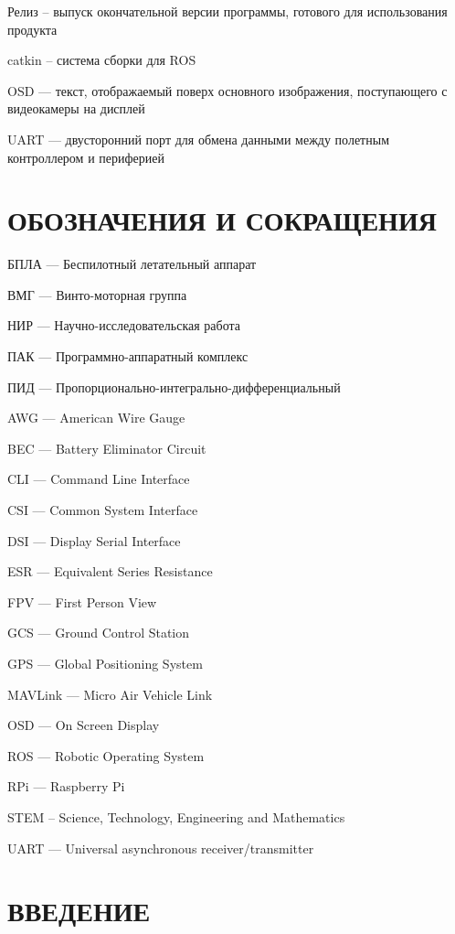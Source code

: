 \documentclass[a4paper,12pt]{article}
\begin{document}
Релиз -- выпуск окончательной версии программы, готового для использования продукта

catkin -- система сборки для ROS

OSD --- текст, отображаемый поверх основного изображения, поступающего с видеокамеры на дисплей

UART --- двусторонний порт для обмена данными между полетным контроллером и периферией

\pagebreak
\thispagestyle{empty}

\section*{\centering ОБОЗНАЧЕНИЯ И СОКРАЩЕНИЯ}

БПЛА --- Беспилотный летательный аппарат

ВМГ --- Винто-моторная группа

НИР --- Научно-исследовательская работа

ПАК --- Программно-аппаратный комплекс

ПИД --- Пропорционально-интегрально-дифференциальный

AWG --- American Wire Gauge

BEC --- Battery Eliminator Circuit

CLI --- Command Line Interface

CSI --- Common System Interface

DSI --- Display Serial Interface

ESR --- Equivalent Series Resistance

FPV --- First Person View

GCS --- Ground Control Station

GPS --- Global Positioning System

MAVLink --- Micro Air Vehicle Link

OSD --- On Screen Display

ROS --- Robotic Operating System

RPi --- Raspberry Pi

STEM -- Science, Technology, Engineering and Mathematics

UART --- Universal asynchronous receiver/transmitter


\pagebreak
{}
\tableofcontents

\thispagestyle{empty} %
\pagebreak

\setcounter{page}{3}
\section*{\centering ВВЕДЕНИЕ}
\pagebreak
\pagebreak
\pagebreak
\pagebreak
\pagebreak
\pagebreak
\end{document}

